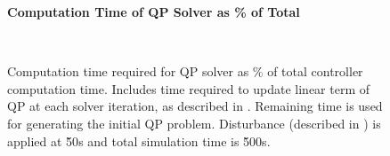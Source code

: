 \ifmakeplots
\begin{figure}
  \centering
  {\large\bfseries Computation Time of QP Solver as \% of Total\\}
  \begin{subfigure}{0.75\linewidth}
  
  \end{subfigure}
  \\
  \begin{subfigure}{0.75\linewidth}
  
  \end{subfigure}
  \caption[QP solver computation time.]{Computation time required for QP solver as \% of total controller computation time. Includes time required to update linear term of QP at each solver iteration, as described in . Remaining time is used for generating the initial QP problem. Disturbance (described in ) is applied at \u{50}{s} and total simulation time is \u{500}{s}.}
  \label{fig:res:qp-compcost}
\end{figure}
\fi

